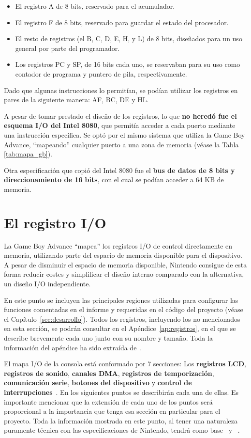 \begin{itemize}
\item El registro A de 8 bits, reservado para el acumulador.
\item El registro F de 8 bits, reservado para guardar el estado del procesador.
\item El resto de registros (el B, C, D, E, H, y L) de 8 bits, diseñados para un uso general por parte del programador.
\item Los registros PC y SP, de 16 bits cada uno, se reservaban para su uso como contador de programa y puntero de pila, respectivamente.
\end{itemize}

Dado que algunas instrucciones lo permitían, se podían utilizar los registros en pares de la siguiente manera: AF, BC, DE y HL.

A pesar de tomar prestado el diseño de los registros, lo que \textbf{no heredó fue el esquema I/O del Intel 8080}, que permitía acceder a cada puerto mediante una instrucción específica. Se optó por el mismo sistema que utiliza la Game Boy Advance, ``mapeando'' cualquier puerto a una zona de memoria (véase la Tabla \ref{tab:mapa_gb}).

Otra especificación que copió del Intel 8080 fue el \textbf{bus de datos de 8 bits y direccionamiento de 16 bits}, con el cual se podían acceder a 64 KB de memoria.

\section{El registro I/O}

La Game Boy Advance ``mapea'' los registros I/O de control directamente en memoria, utilizando parte del espacio de memoria disponible para el dispositivo. A pesar de disminuir el espacio de memoria disponible, Nintendo consigue de esta forma reducir costes y simplificar el diseño interno comparado con la alternativa, un diseño I/O independiente.

En este punto se incluyen las principales regiones utilizadas para configurar las funciones comentadas en el informe y requeridas en el código del proyecto (véase el Capítulo~\ref{sec:desarrollo}). Todos los registros, incluyendo los no mencionados en esta sección, se podrán consultar en el Apéndice~\ref{ap:registros}, en el que se describe brevemente cada uno junto con su nombre y tamaño. Toda la información del apéndice ha sido extraída de~\cite{bib:gbatek}.

El mapa I/O de la consola está conformado por 7 secciones: Los \textbf{registros LCD}, \textbf{registros de sonido}, \textbf{canales DMA}, \textbf{registros de temporización}, \textbf{comunicación serie}, \textbf{botones del dispositivo} y \textbf{control de interrupciones}~\cite{bib:gbatek}. En los siguientes puntos se describirán cada una de ellas. Es importante mencionar que la extensión de cada uno de los puntos será proporcional a la importancia que tenga esa sección en particular para el proyecto. Toda la información mostrada en este punto, al tener una naturaleza puramente técnica con las especificaciones de Nintendo, tendrá como base~\cite{bib:gba_manual} y~\cite{bib:gbatek} .

